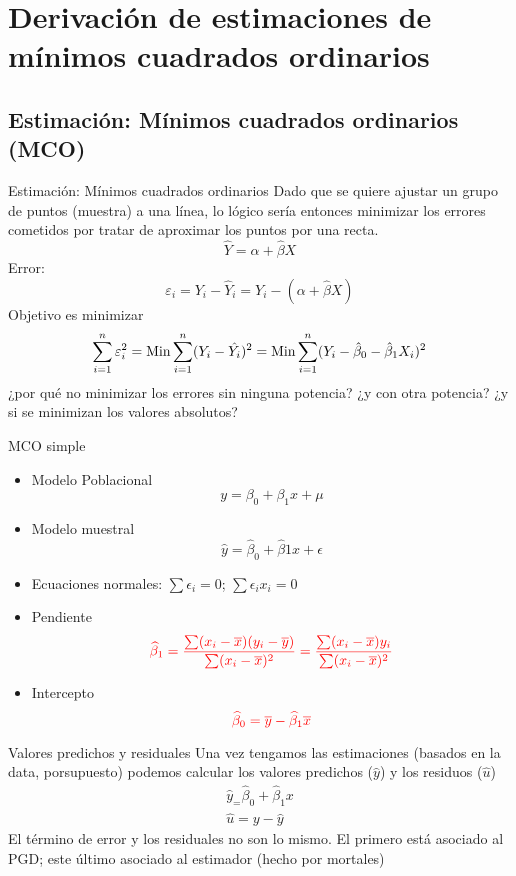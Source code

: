 \section{Derivación de estimaciones de mínimos cuadrados ordinarios}

\subsection{Estimación: Mínimos cuadrados ordinarios (MCO)}
\begin{frame}{Estimación: Mínimos cuadrados ordinarios}
	Dado que se quiere ajustar un grupo de puntos (muestra) a una línea, lo lógico sería entonces minimizar los errores cometidos por tratar de aproximar los puntos por una recta.
	$$\hat Y = \alpha+ \widehat{\beta} X$$
	Error:
	$$\varepsilon_i=Y_i-\hat Y_i=Y_i-(\alpha+\widehat{\beta} X)$$
	Objetivo es minimizar 
	$$\sum_{i=1}^n \varepsilon _i ^2 = \textup{Min} \sum_{i=1}^{n} (Y_{i}-\hat{Y_{i}})^{2}=\textup{Min} \sum_{i=1}^{n} (Y_{i}-\hat{\beta}_{0}-\hat{\beta}_{1}X_{i})^{2}$$
	¿por qué no minimizar los errores sin ninguna potencia? ¿y con otra potencia? ¿y si se minimizan los valores absolutos?
\end{frame}
\begin{frame}{MCO simple}
	\begin{itemize}
		\item Modelo Poblacional
		$$y=\beta_{0}+\beta_{1}x+\mu$$
		\item Modelo muestral
		$$\widehat{y}=\widehat{\beta}_{0}+\widehat{\beta}{1}x+\epsilon$$
		\item Ecuaciones normales: $\sum \epsilon_{i}=0$; $\sum \epsilon_{i}x_{i}=0$
		\item Pendiente
		$$\textcolor{red}{\widehat{\beta}_1 = \frac{\sum (x_{i}-\overline{x})(y_{i}-\overline{y})}{\sum (x_{i}-\overline{x})^2}=\frac{\sum (x_{i}-\overline{x})y_{i}}{\sum (x_{i}-\overline{x})^2}}$$
		\item Intercepto
		$$\textcolor{red}{\widehat{\beta}_{0}=\overline{y}-\widehat{\beta}_{1}\overline{x}}$$
	\end{itemize}
\end{frame}
\begin{frame}{Valores predichos y residuales}
	Una vez tengamos las estimaciones (basados en la data, porsupuesto) podemos calcular los valores predichos ($\widehat{y}$) y los residuos ($\widehat{u}$)
	\begin{gather*}
		\widehat{y}_ = \widehat{\beta}_0 + \widehat{\beta}_1x\\
		\widehat{u} = y - \widehat{y}
	\end{gather*}
	El término de error y los residuales no son lo mismo. El primero está asociado al PGD; este último asociado al estimador (hecho por mortales)
\end{frame}
